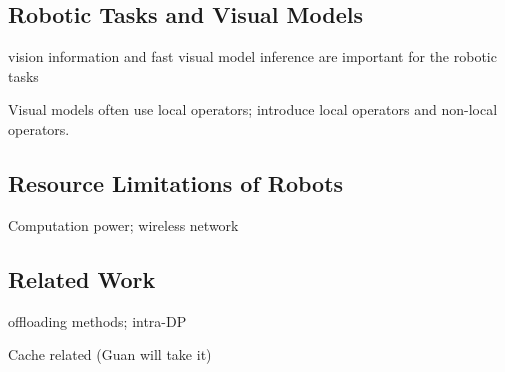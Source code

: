 \subsection{Robotic Tasks and Visual Models}

vision information and fast visual model inference are important for the robotic tasks

Visual models often use local operators; introduce local operators and non-local operators.

\subsection{Resource Limitations of Robots}
Computation power; wireless network

\subsection{Related Work}
offloading methods; intra-DP

Cache related (Guan will take it)